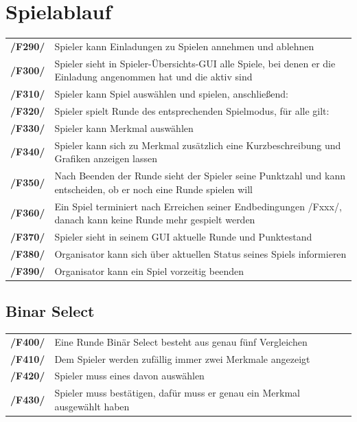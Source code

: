 \documentclass[a4paper]{scrreprt}
\begin{document}
    \section{Spielablauf} 
    \begin{tabularx}{\linewidth}{@{}>{\bfseries}l@{\hspace{.5em}}X@{}}
    /F290/ & \Gls{Spieler} kann Einladungen zu Spielen annehmen und ablehnen \\
    /F300/ & \Gls{Spieler} sieht in Spieler-Übersichts-GUI alle Spiele, bei denen er die Einladung angenommen hat und die aktiv sind \\
    /F310/ & \Gls{Spieler} kann Spiel auswählen und spielen, anschließend: \\
    /F320/ & \Gls{Spieler} spielt Runde des entsprechenden \Gls{Spielmodus}, für alle gilt: \\
    /F330/ & \Gls{Spieler} kann Merkmal auswählen \\
    /F340/ & \Gls{Spieler} kann sich zu Merkmal zusätzlich eine Kurzbeschreibung und Grafiken anzeigen lassen \\
    /F350/ & Nach Beenden der Runde sieht der \Gls{Spieler} seine Punktzahl und kann entscheiden, ob er noch eine Runde spielen will \\
	/F360/ & Ein Spiel terminiert nach Erreichen seiner Endbedingungen /Fxxx/, danach kann keine Runde mehr gespielt werden \\
    /F370/ & \Gls{Spieler} sieht in seinem GUI aktuelle Runde und Punktestand \\
	/F380/ & \Gls{Organisator} kann sich über aktuellen Status seines Spiels informieren \\ %
	/F390/ & \Gls{Organisator} kann ein Spiel vorzeitig beenden \\
    \end{tabularx}
    
    \subsection{\Gls{Binar Select}}
    \begin{tabularx}{\linewidth}{@{}>{\bfseries}l@{\hspace{.5em}}X@{}}
        /F400/ & Eine Runde Binär Select besteht aus genau fünf Vergleichen \\
    	/F410/ & Dem \Gls{Spieler} werden zufällig immer zwei Merkmale angezeigt \\
    	/F420/ & \Gls{Spieler} muss eines davon auswählen \\
    	/F430/ & \Gls{Spieler} muss bestätigen, dafür muss er genau ein Merkmal ausgewählt haben \\
    \end{tabularx}
\end{document}
